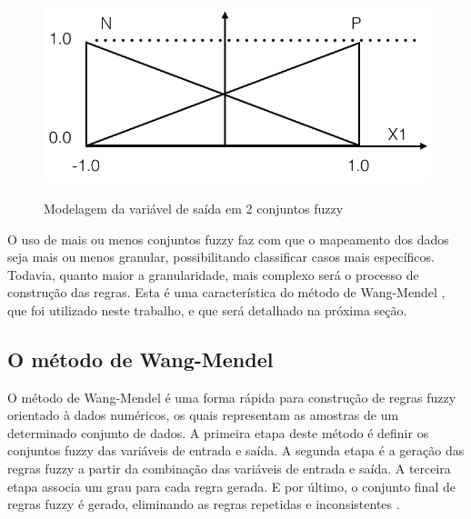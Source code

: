 \begin{figure}[H]
\caption{Modelagem da variável de saída em 2 conjuntos fuzzy}
\centering
\includegraphics[scale=0.45]{conjuntos_fuzzy_saida.png}
\label{figura:conjuntos_fuzzy_saida}
\end{figure}

O uso de mais ou menos conjuntos fuzzy faz com que o mapeamento dos dados seja mais ou menos granular, possibilitando classificar casos mais específicos. Todavia, quanto maior a granularidade, mais complexo será o processo de construção das regras. Esta é uma característica do método de Wang-Mendel \cite{wang1992generating}, que foi utilizado neste trabalho, e que será detalhado na próxima seção.


\subsection{O método de Wang-Mendel}

O método de Wang-Mendel é uma forma rápida para construção de regras fuzzy orientado à dados numéricos, os quais representam as amostras de um determinado conjunto de dados. A primeira etapa deste método é definir os conjuntos fuzzy das variáveis de entrada e saída. A segunda etapa é a geração das regras fuzzy a partir da combinação das variáveis de entrada e saída. A terceira etapa associa um grau para cada regra gerada. E por último, o conjunto final de regras fuzzy é gerado, eliminando as regras repetidas e inconsistentes \cite{wang1992generating}.


